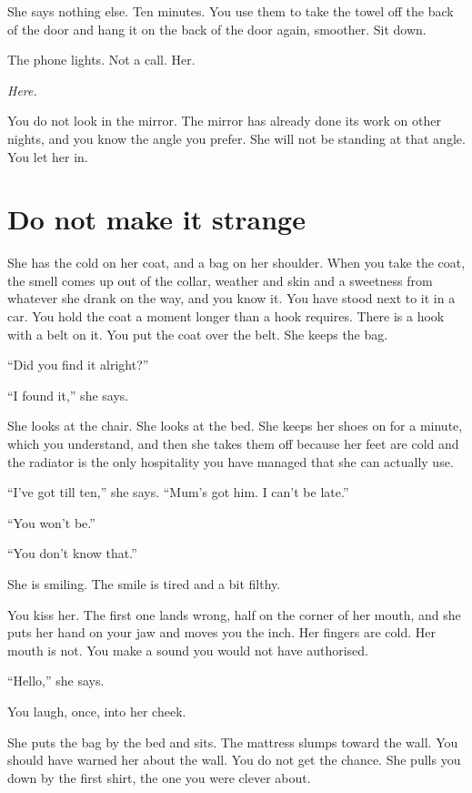 \documentclass[11pt,oneside]{book}
\begin{document}
She says nothing else. Ten minutes. You use them to take the towel off the back of the door and hang it on the back of the door again, smoother. Sit down.

The phone lights. Not a call. Her.

\emph{Here.}

You do not look in the mirror. The mirror has already done its work on other nights, and you know the angle you prefer. She will not be standing at that angle. You let her in.

\section*{Do not make it strange}

She has the cold on her coat, and a bag on her shoulder. When you take the coat, the smell comes up out of the collar, weather and skin and a sweetness from whatever she drank on the way, and you know it. You have stood next to it in a car. You hold the coat a moment longer than a hook requires. There is a hook with a belt on it. You put the coat over the belt. She keeps the bag.

``Did you find it alright?''

``I found it,'' she says.

She looks at the chair. She looks at the bed. She keeps her shoes on for a minute, which you understand, and then she takes them off because her feet are cold and the radiator is the only hospitality you have managed that she can actually use.

``I've got till ten,'' she says. ``Mum's got him. I can't be late.''

``You won't be.''

``You don't know that.''

She is smiling. The smile is tired and a bit filthy.

You kiss her. The first one lands wrong, half on the corner of her mouth, and she puts her hand on your jaw and moves you the inch. Her fingers are cold. Her mouth is not. You make a sound you would not have authorised.

``Hello,'' she says.

You laugh, once, into her cheek.

She puts the bag by the bed and sits. The mattress slumps toward the wall. You should have warned her about the wall. You do not get the chance. She pulls you down by the first shirt, the one you were clever about.
\end{document}
